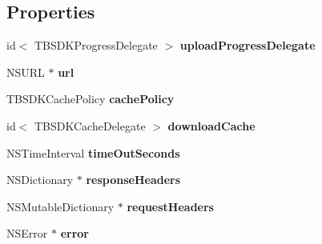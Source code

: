 \subsection*{Properties}
\begin{DoxyCompactItemize}
\item 
\mbox{\label{protocol_t_b_s_d_k_connection_protocol_01-p_a06f3535fe6ac474bb63940ca24ebbdaa}} 
id$<$ T\+B\+S\+D\+K\+Progress\+Delegate $>$ {\bfseries upload\+Progress\+Delegate}
\item 
\mbox{\label{protocol_t_b_s_d_k_connection_protocol_01-p_afcebb2fcc99c6f4b5e7d74e266049e10}} 
N\+S\+U\+RL $\ast$ {\bfseries url}
\item 
\mbox{\label{protocol_t_b_s_d_k_connection_protocol_01-p_a297f4b290043bcbc78587ea1192f8bf1}} 
T\+B\+S\+D\+K\+Cache\+Policy {\bfseries cache\+Policy}
\item 
\mbox{\label{protocol_t_b_s_d_k_connection_protocol_01-p_aa8c32cc1796efbbf8a2ea7c3d60e253b}} 
id$<$ T\+B\+S\+D\+K\+Cache\+Delegate $>$ {\bfseries download\+Cache}
\item 
\mbox{\label{protocol_t_b_s_d_k_connection_protocol_01-p_abb168fec77797768f40bfd589f6f6e7e}} 
N\+S\+Time\+Interval {\bfseries time\+Out\+Seconds}
\item 
\mbox{\label{protocol_t_b_s_d_k_connection_protocol_01-p_a298bc1455bf764c83576cdaed0f1d6ac}} 
N\+S\+Dictionary $\ast$ {\bfseries response\+Headers}
\item 
\mbox{\label{protocol_t_b_s_d_k_connection_protocol_01-p_acf1e472618864b66a1be55fa7e8b21ae}} 
N\+S\+Mutable\+Dictionary $\ast$ {\bfseries request\+Headers}
\item 
\mbox{\label{protocol_t_b_s_d_k_connection_protocol_01-p_a89d700af2709ec18c7bb9060a28eb68e}} 
N\+S\+Error $\ast$ {\bfseries error}
\item 

\end{DoxyCompactItemize}
